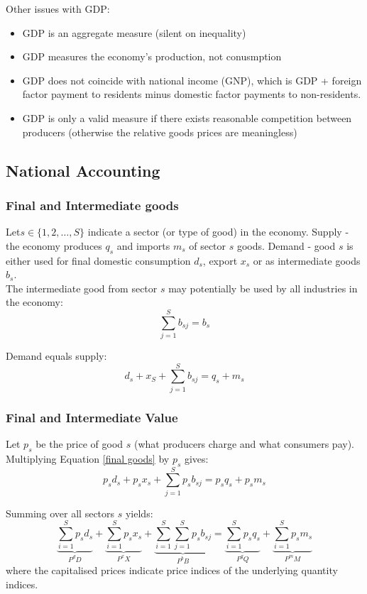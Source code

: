 \documentclass[11pt]{article}
\begin{document}
Other issues with GDP:
\begin{itemize} \setcounter{enumi}{4}
    \item GDP is an aggregate measure (silent on inequality)
    \item GDP measures the economy's production, not conusmption
    \item GDP does not coincide with national income (GNP), which is GDP + foreign factor payment to residents minus domestic factor payments to non-residents.
    \item GDP is only a valid measure if there exists reasonable competition between producers (otherwise the relative goods prices are meaningless)
\end{itemize}
\subsection{National Accounting}
\subsubsection{Final and Intermediate goods}

Let$s\in \{ 1,2,\ldots, S\}$ indicate a sector (or type of good) in the economy. Supply - the economy produces $q_s$ and imports $m_s$ of sector $s$ goods. Demand - good $s$ is either used for final domestic consumption $d_s$, export $x_s$ or as intermediate goods $b_s$.\\
The intermediate good from sector $s$ may potentially be used by all industries in the economy:
\[ \sum_{j=1}^S b_{sj} = b_s\]

\begin{shaded}
    Demand equals supply:
    \begin{equation}
    \label{final goods}
        d_s +x_S + \sum_{j=1}^S b_{sj} = q_s + m_s
    \end{equation}

\end{shaded}

\subsubsection{Final and Intermediate Value}

Let $p_s$ be the price of good $s$ (what producers charge and what consumers pay). Multiplying Equation \eqref{final goods} by $p_s$ gives:
\[p_sd_s + p_s x_s +\sum_{j=1}^S p_s b_{sj} = p_sq_s + p_sm_s\]

\begin{shaded}
    Summing over all sectors $s$ yields:
    \begin{equation}
        \underbrace{\sum_{i=1}^S p_s d_s}_{P^d D} + \underbrace{\sum_{i=1}^S p_s x_s}_{P^x X} + \underbrace{\sum_{i=1}^S \sum_{j=1}^S p_s b_{sj}}_{P^b B} = \underbrace{\sum_{i=1}^S p_s q_s}_{P^q Q} + \underbrace{\sum_{i=1}^S p_s m_s}_{P^m M}
    \end{equation}
    where the capitalised prices indicate price indices of the underlying quantity indices.
\end{shaded}
\end{document}
